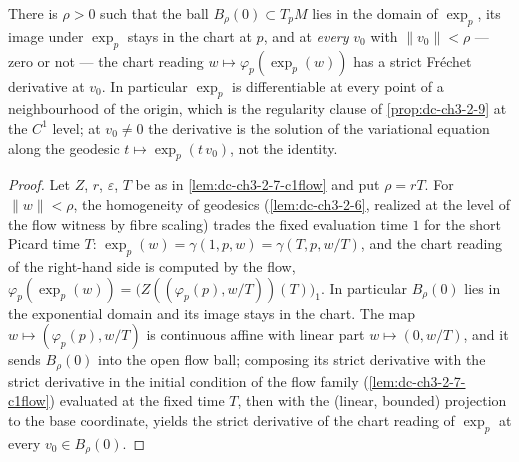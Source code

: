 \begin{lemma}
  \label{lem:dc-ch3-2-9-c1ball}


  There is $\rho > 0$ such that the ball $B_\rho(0) \subset T_pM$ lies in the
  domain of $\exp_p$, its image under $\exp_p$ stays in the chart at $p$, and
  at \emph{every} $v_0$ with $\|v_0\| < \rho$ — zero or not — the chart
  reading $w \mapsto \varphi_p(\exp_p(w))$ has a strict Fr\'echet derivative
  at $v_0$. In particular $\exp_p$ is differentiable at every point of a
  neighbourhood of the origin, which is the regularity clause of
  \cref{prop:dc-ch3-2-9} at the $C^1$ level; at $v_0 \ne 0$ the derivative is
  the solution of the variational equation along the geodesic
  $t \mapsto \exp_p(t\,v_0)$, not the identity.
\end{lemma}
\begin{proof}
  \sketch

  Let $Z$, $r$, $\varepsilon$, $T$ be as in \cref{lem:dc-ch3-2-7-c1flow} and
  put $\rho = rT$. For $\|w\| < \rho$, the homogeneity of geodesics
  (\cref{lem:dc-ch3-2-6}, realized at the level of the flow witness by fibre
  scaling) trades the fixed evaluation time $1$ for the short Picard time
  $T$: $\exp_p(w) = \gamma(1, p, w) = \gamma(T, p, w/T)$, and the chart
  reading of the right-hand side is computed by the flow,
  $\varphi_p(\exp_p(w)) = \big(Z((\varphi_p(p), w/T))(T)\big)_1$. In
  particular $B_\rho(0)$ lies in the exponential domain and its image stays
  in the chart. The map $w \mapsto (\varphi_p(p), w/T)$ is continuous affine
  with linear part $w \mapsto (0, w/T)$, and it sends $B_\rho(0)$ into the
  open flow ball; composing its strict derivative with the strict derivative
  in the initial condition of the flow family (\cref{lem:dc-ch3-2-7-c1flow})
  evaluated at the fixed time $T$, then with the (linear, bounded) projection
  to the base coordinate, yields the strict derivative of the chart reading
  of $\exp_p$ at every $v_0 \in B_\rho(0)$.
\end{proof}

